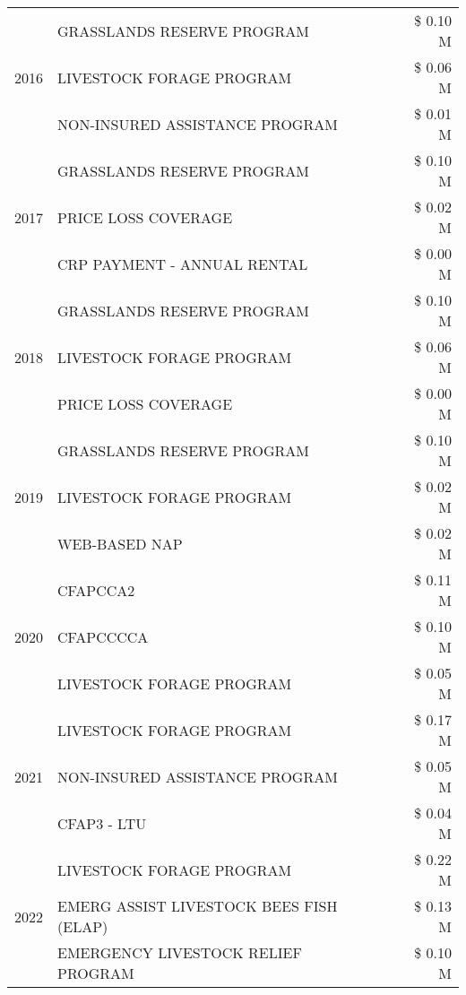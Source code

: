 \begin{tabular}{llr}
\cline{1-3}
\multirow[t]{3}{*}{2016} & GRASSLANDS RESERVE PROGRAM & \$ 0.10 M \\
 & LIVESTOCK FORAGE PROGRAM & \$ 0.06 M \\
 & NON-INSURED ASSISTANCE PROGRAM & \$ 0.01 M \\
\cline{1-3}
\multirow[t]{3}{*}{2017} & GRASSLANDS RESERVE PROGRAM & \$ 0.10 M \\
 & PRICE LOSS COVERAGE & \$ 0.02 M \\
 & CRP PAYMENT - ANNUAL RENTAL & \$ 0.00 M \\
\cline{1-3}
\multirow[t]{3}{*}{2018} & GRASSLANDS RESERVE PROGRAM & \$ 0.10 M \\
 & LIVESTOCK FORAGE PROGRAM & \$ 0.06 M \\
 & PRICE LOSS COVERAGE & \$ 0.00 M \\
\cline{1-3}
\multirow[t]{3}{*}{2019} & GRASSLANDS RESERVE PROGRAM & \$ 0.10 M \\
 & LIVESTOCK FORAGE PROGRAM & \$ 0.02 M \\
 & WEB-BASED NAP & \$ 0.02 M \\
\cline{1-3}
\multirow[t]{3}{*}{2020} & CFAPCCA2 & \$ 0.11 M \\
 & CFAPCCCCA & \$ 0.10 M \\
 & LIVESTOCK FORAGE PROGRAM & \$ 0.05 M \\
\cline{1-3}
\multirow[t]{3}{*}{2021} & LIVESTOCK FORAGE PROGRAM & \$ 0.17 M \\
 & NON-INSURED ASSISTANCE PROGRAM & \$ 0.05 M \\
 & CFAP3 - LTU & \$ 0.04 M \\
\cline{1-3}
\multirow[t]{3}{*}{2022} & LIVESTOCK FORAGE PROGRAM & \$ 0.22 M \\
 & EMERG ASSIST LIVESTOCK BEES FISH (ELAP) & \$ 0.13 M \\
 & EMERGENCY LIVESTOCK RELIEF PROGRAM & \$ 0.10 M \\
\cline{1-3}
\bottomrule
\end{tabular}
